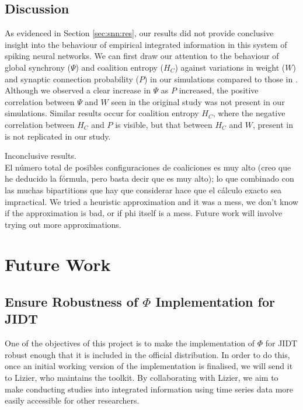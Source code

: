 \documentclass[a4paper,11pt]{article}
\begin{document}
\subsection{Discussion}
\label{sec:snn:disc}

As evidenced in Section \ref{sec:snn:res}, our results did not provide conclusive insight into the behaviour of empirical integrated information in this system of spiking neural networks. We can first draw our attention to the behaviour of global synchrony ($\Psi$) and coalition entropy ($H_C$) against variations in weight ($W$) and synaptic connection probability ($P$) in our simulations compared to those in \cite{Bhowmik2013}. Although we observed a clear increase in $\Psi$ as $P$ increased, the positive correlation between $\Psi$ and $W$ seen in the original study was not present in our simulations. Similar results occur for coalition entropy $H_C$, where the negative correlation between $H_C$ and $P$ is visible, but that between $H_C$ and $W$, present in \cite{Bhowmik2013} is not replicated in our study.
 

 
Inconclusive results.\\
El número total de posibles configuraciones de coaliciones es muy alto (creo que he deducido la fórmula, pero basta decir que es muy alto); lo que combinado con las muchas bipartitions que hay que considerar hace que el cálculo exacto sea impractical. We tried a heuristic approximation and it was a mess, we don't know if the approximation is bad, or if phi itself is a mess. Future work will involve trying out more approximations.\\


\clearpage

\section{Future Work}
\label{sec:fw}

\subsection{Ensure Robustness of $\Phi$ Implementation for JIDT}
\label{sec:fw:jidt}
One of the objectives of this project is to make the implementation of $\Phi$ for JIDT robust enough that it is included in the official distribution. In order to do this, once an initial working version of the implementation is finalised, we will send it to Lizier, who maintains the toolkit. By collaborating with Lizier, we aim to make conducting studies into integrated information using time series data more easily accessible for other researchers.
\end{document}
